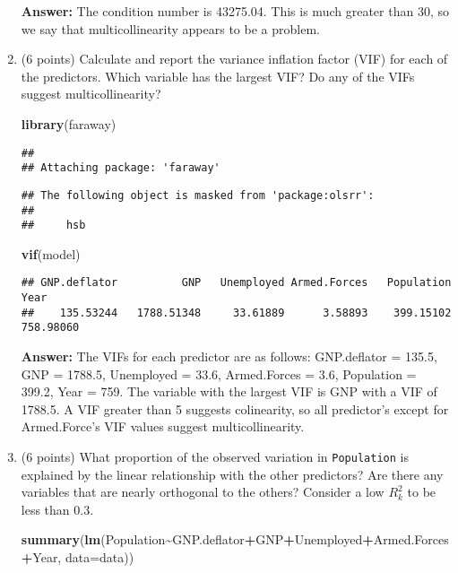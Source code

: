 \documentclass[
]{article}
\newenvironment{Shaded}{\begin{snugshade}}{\end{snugshade}}
\newcommand{\AttributeTok}[1]{\textcolor[rgb]{0.13,0.29,0.53}{#1}}
\newcommand{\FunctionTok}[1]{\textcolor[rgb]{0.13,0.29,0.53}{\textbf{#1}}}
\newcommand{\NormalTok}[1]{#1}
\newcommand{\SpecialCharTok}[1]{\textcolor[rgb]{0.81,0.36,0.00}{\textbf{#1}}}
\begin{document}
\begin{enumerate}
  \textbf{Answer:} The condition number is 43275.04. This is much
  greater than 30, so we say that multicollinearity appears to be a
  problem.
\item
  (6 points) Calculate and report the variance inflation factor (VIF)
  for each of the predictors. Which variable has the largest VIF? Do any
  of the VIFs suggest multicollinearity?

\begin{Shaded}
\begin{Highlighting}[]
\FunctionTok{library}\NormalTok{(faraway)}
\end{Highlighting}
\end{Shaded}

\begin{verbatim}
## 
## Attaching package: 'faraway'
\end{verbatim}

\begin{verbatim}
## The following object is masked from 'package:olsrr':
## 
##     hsb
\end{verbatim}

\begin{Shaded}
\begin{Highlighting}[]
\FunctionTok{vif}\NormalTok{(model)}
\end{Highlighting}
\end{Shaded}

\begin{verbatim}
## GNP.deflator          GNP   Unemployed Armed.Forces   Population         Year 
##    135.53244   1788.51348     33.61889      3.58893    399.15102    758.98060
\end{verbatim}

  \textbf{Answer:} The VIFs for each predictor are as follows:
  GNP.deflator = 135.5, GNP = 1788.5, Unemployed = 33.6, Armed.Forces =
  3.6, Population = 399.2, Year = 759. The variable with the largest VIF
  is GNP with a VIF of 1788.5. A VIF greater than 5 suggests
  colinearity, so all predictor's except for Armed.Force's VIF values
  suggest multicollinearity.
\item
  (6 points) What proportion of the observed variation in
  \texttt{Population} is explained by the linear relationship with the
  other predictors? Are there any variables that are nearly orthogonal
  to the others? Consider a low \(R^2_k\) to be less than 0.3.

\begin{Shaded}
\begin{Highlighting}[]
\FunctionTok{summary}\NormalTok{(}\FunctionTok{lm}\NormalTok{(Population}\SpecialCharTok{\textasciitilde{}}\NormalTok{GNP.deflator}\SpecialCharTok{+}\NormalTok{GNP}\SpecialCharTok{+}\NormalTok{Unemployed}\SpecialCharTok{+}\NormalTok{Armed.Forces}\SpecialCharTok{+}\NormalTok{Year, }\AttributeTok{data=}\NormalTok{data))}
\end{Highlighting}
\end{Shaded}


\end{enumerate}
\end{document}
